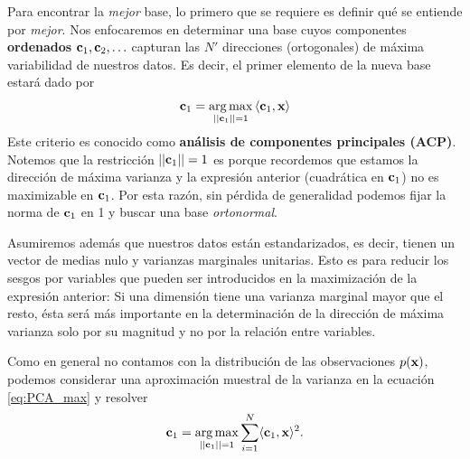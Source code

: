 Para encontrar la \emph{mejor} base, lo primero que se requiere es definir qué se entiende por \emph{mejor}. Nos enfocaremos en determinar una base cuyos componentes \textbf{ordenados} $\mathbf{c}_1,\mathbf{c}_2,\ldots$ capturan las $N'$ direcciones (ortogonales) de máxima variabilidad de nuestros datos. Es decir, el primer elemento de la nueva base estará dado por 
\begin{equation}
	\mathbf{c}_1 = \operatorname*{arg\,max}_{||\mathbf{c}_1||=1} {\langle\mathbf{c}_1,\mathbf{x}\rangle} \label{eq:PCA_max}
\end{equation}
Este criterio es conocido como \textbf{análisis de componentes principales (ACP)}. Notemos que la restricción $||\mathbf{c}_1||=1$ es porque recordemos que estamos la dirección de máxima varianza y  la expresión anterior (cuadrática en $\mathbf{c}_1$) no es maximizable en $\mathbf{c}_1$. Por esta razón, sin pérdida de generalidad podemos fijar la norma de $\mathbf{c}_1$ en 1 y buscar una base \emph{ortonormal}. 

Asumiremos además que nuestros datos están estandarizados, es decir, tienen un vector de medias nulo y varianzas marginales unitarias. Esto es para reducir los sesgos por variables que pueden ser introducidos en la maximización de la expresión anterior: Si una dimensión tiene una varianza marginal mayor que el resto, ésta será más importante en la determinación de la dirección de máxima varianza solo por su magnitud y no por la relación entre variables. 

Como en general no contamos con la distribución de las observaciones $p(\mathbf{x})$, podemos considerar una aproximación muestral de la varianza en la ecuación \eqref{eq:PCA_max} y resolver 
\begin{align}
	\mathbf{c}_1 = \operatorname*{arg\,max}_{||\mathbf{c}_1||=1} \sum_{i=1}^N \langle\mathbf{c}_1,\mathbf{x}\rangle^2.\label{eq:PCA_max2}
\end{align}

